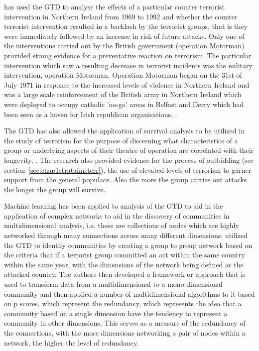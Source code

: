 \citep{lafree2009impact} has used the GTD to analyse the effects of a particular counter terrorist intervention in Northern Ireland from 1969 to 1992 and whether the counter terrorist intervention resulted in a backlash by the terrorist groups, that is they were immediately followed by an increase in risk of future attacks. Only one of the interventions carried out by the British government (operation Motorman) provided strong evidence for a preventative reaction on  terrorism. The particular intervention which saw a resulting decrease in terrorist incidents was the military intervention, operation Motorman. 
Operation Motorman began on the 31st of July 1971 in response to the increased levels of violence in Northern Ireland \citep{edwards2011northern} and was a large scale reinforcement of the British army in Northern Ireland which were deployed to occupy catholic 'no-go' areas in Belfast and Derry which had been seen as a haven for Irish republican organisations. \citep{neumann2003myth}.

The GTD has also allowed the application of survival analysis to be utilized in the study of terrorism for the purpose of discerning what characteristics of a group or underlying aspects of their theatre of operation are correlated with their longevity, \citep{young2014survival}. The  research also provided evidence for the  process of outbidding (see section~\ref{sec:chap1strataimsterr}),  the use of elevated levels of terrorism to garner support from the general populace. Also the more the group carries out attacks the longer the group will survive.

Machine learning has been applied to analysis of the GTD to aid in the application of complex networks to aid in the discovery of communities in multidimensional analysis, i.e. these are collections of nodes which are highly networked through many connections across many different dimensions. \citep{berlingerio2011finding} utilized the GTD to identify communities by creating a group to group network based on the criteria that if a terrorist group committed an act within the same country within the same year, with the dimensions of the network being defined as the attacked country. The authors then developed a framework or approach that is used to transform data from a multidimensional to a mono-dimensional community and then applied a number of multidimensional algorithms to it based on p scores, which represent the redundancy, which represents the idea that a community based on a single dimension have the tendency to represent a community in other dimensions. This serves as a measure of the redundancy of the connections, with the more dimensions networking a pair of nodes within a network, the higher the level of redundancy. 

